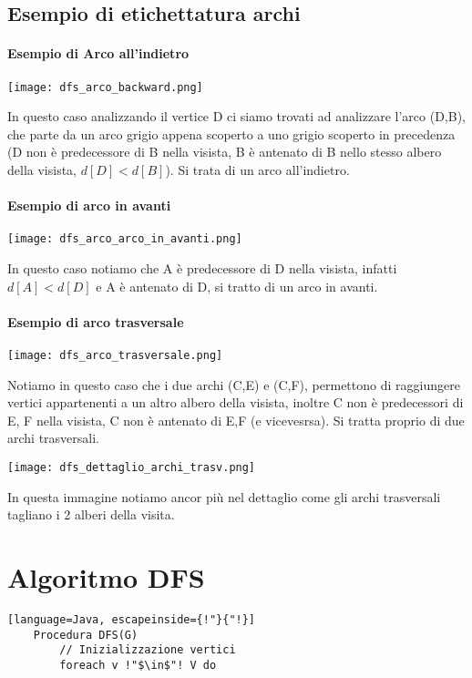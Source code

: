 \subsection{Esempio di etichettatura archi}
\paragraph*{Esempio di Arco all'indietro}
\begin{center}
    \texttt{[image: dfs\_arco\_backward.png]}
\end{center}
In questo caso analizzando il vertice D ci siamo trovati ad analizzare l'arco (D,B),
che parte da un arco grigio appena scoperto a uno grigio scoperto in precedenza (D non
è predecessore di B nella visista, B è antenato di B nello stesso albero della visista,
$d[D] < d[B]$). Si trata di un arco all'indietro.
\paragraph*{Esempio di arco in avanti}
\begin{center}
    \texttt{[image: dfs\_arco\_arco\_in\_avanti.png]}
\end{center}
In questo caso notiamo che A è predecessore di D nella visista, infatti $d[A] < d[D]$ e
A è antenato di D, si tratto di un arco in avanti.\\
\paragraph*{Esempio di arco trasversale}
\begin{center}
    \texttt{[image: dfs\_arco\_trasversale.png]}
\end{center}
Notiamo in questo caso che i due archi (C,E) e (C,F), permettono di raggiungere vertici
appartenenti a un altro albero della visista, inoltre C non è predecessori di E, F nella
visista, C non è antenato di E,F (e vicevesrsa). Si tratta proprio di due archi trasversali.
\begin{center}
    \texttt{[image: dfs\_dettaglio\_archi\_trasv.png]}
\end{center}
In questa immagine notiamo ancor più nel dettaglio come gli archi trasversali tagliano i
2 alberi della visita.
\section{Algoritmo DFS}
\begin{lstlisting}[language=Java, escapeinside={!"}{"!}]
    Procedura DFS(G)
        // Inizializzazione vertici
        foreach v !"$\in$"! V do
\end{lstlisting}
